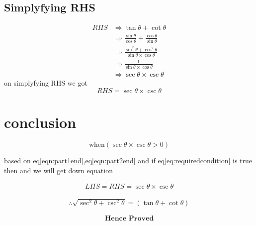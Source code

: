 \documentclass[12pt,twocolumn]{article}
\begin{document}
\subsection*{Simplyfying RHS}
 \begin{align}
  RHS&\Rightarrow \tan{\theta}+\cot{\theta}  \\
     &\Rightarrow  \frac{\sin{\theta}}{\cos{\theta}}+\frac{\cos{\theta}}{\sin{\theta}} \\
     &\Rightarrow \frac{\sin^2{\theta}+\cos^2{\theta}}{\sin{\theta}\times\cos{\theta}}\\
     &\Rightarrow \frac{1}{\sin{\theta}\times\cos{\theta}}\\
     &\Rightarrow \sec{\theta}\times\csc{\theta}
 \end{align}
on simplyfying RHS we got
\begin{equation}
\label{eqn:part2end}
RHS =  \sec{\theta}\times\csc{\theta}
\end{equation}

\section*{conclusion}

\begin{equation}
\label{eq:requiredcondition}
  \text{when} (\sec{\theta}\times\csc{\theta} >0 )   
\end{equation}

 based on eq\eqref{eqn:part1end},eq\eqref{eqn:part2end} and if eq\eqref{eq:requiredcondition} is true then and we will get down equation
 
 \begin{align}
 LHS = RHS = \sec{\theta}\times\csc{\theta} 
 \end{align}
 

\begin{align*}
\therefore\sqrt{\sec^2{\theta}+\csc^2{\theta}}=(\tan{\theta}+\cot{\theta})
\end{align*}


\[\textbf{Hence Proved}\]
\end{document}
